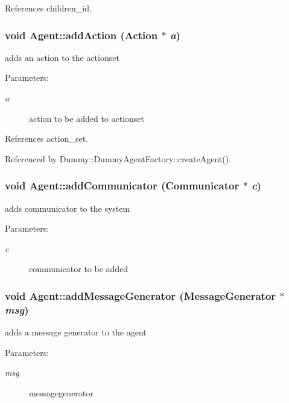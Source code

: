 References children\_\-id.
\subsubsection[addAction]{\setlength{\rightskip}{0pt plus 5cm}void Agent::addAction ({\bf Action} $\ast$ {\em a})}\label{classHive_1_1Agent_f03cb3281f45d966a5df796d9922e955}


adds an action to the actionset \begin{Desc}
\item[Parameters:]
\begin{description}
\item[{\em a}]action to be added to actionset \end{description}
\end{Desc}


References action\_\-set.

Referenced by Dummy::DummyAgentFactory::createAgent().
\subsubsection[addCommunicator]{\setlength{\rightskip}{0pt plus 5cm}void Agent::addCommunicator ({\bf Communicator} $\ast$ {\em c})}\label{classHive_1_1Agent_4d1723cd30329f5da052fee0dc6fa5ef}


adds communicator to the system \begin{Desc}
\item[Parameters:]
\begin{description}
\item[{\em c}]communicator to be added \end{description}
\end{Desc}
\subsubsection[addMessageGenerator]{\setlength{\rightskip}{0pt plus 5cm}void Agent::addMessageGenerator ({\bf MessageGenerator} $\ast$ {\em msg})}\label{classHive_1_1Agent_f2414a0dacdc08419a4cc1b2c5d0276f}


adds a message generator to the agent \begin{Desc}
\item[Parameters:]
\begin{description}
\item[{\em msg}]messagegenerator \end{description}
\end{Desc}


